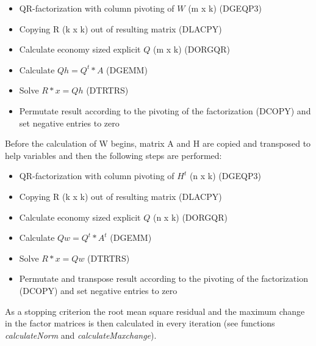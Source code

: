 \documentclass[a4paper,10pt]{scrartcl}
\begin{document}
					\begin{itemize}
					 \item QR-factorization with column pivoting of $W$ (m x k) (DGEQP3)\newline
					 \item Copying R (k x k) out of resulting matrix (DLACPY)\newline
					 \item Calculate economy sized explicit $Q$ (m x k) (DORGQR)\newline
					 \item Calculate $Qh = Q^t * A$ (DGEMM)\newline
					 \item Solve $R * x = Qh$ (DTRTRS)\newline
					 \item Permutate result according to the pivoting of the factorization 
						(DCOPY) and set negative entries to zero\newline
					\end{itemize}


					Before the calculation of W begins, matrix A and H are copied and 
					transposed to help variables and then the following steps are 
					performed:\newline
					
					\begin{itemize}
					 \item QR-factorization with column pivoting of $H^t$ (n x k) (DGEQP3)\newline
					 \item Copying R (k x k) out of resulting matrix (DLACPY)\newline
					 \item Calculate economy sized explicit $Q$ (n x k) (DORGQR)\newline	
					 \item Calculate $Qw = Q^t * A^t$ (DGEMM)\newline
					 \item Solve $R * x = Qw$ (DTRTRS)\newline
					 \item Permutate and transpose result according to the pivoting of the 
						factorization (DCOPY) and set negative entries to zero\newline
					\end{itemize}



					As a stopping criterion the root mean square residual and the maximum 
					change in the factor matrices is then calculated in every iteration (see
					functions \emph{calculateNorm} and \emph{calculateMaxchange}).\newline
\end{document}
